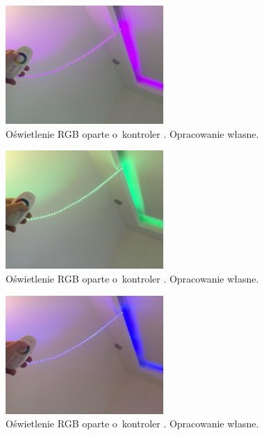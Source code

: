 \documentclass{xmgr}
\begin{document}
\begin{figure}[h]
\centering
\includegraphics[width=6cm]{led1}
\caption{Oświetlenie RGB oparte o~kontroler . Opracowanie własne.}
\label{fig:led1}
\end{figure} 
\begin{figure}[h]
\centering
\includegraphics[width=6cm]{led2}
\caption{Oświetlenie RGB oparte o~kontroler . Opracowanie własne.}
\label{fig:led2}
\end{figure} 
\begin{figure}[h]
\centering
\includegraphics[width=6cm]{led3}
\caption{Oświetlenie RGB oparte o~kontroler . Opracowanie własne.}
\label{fig:led3}
\end{figure}
\end{document}
